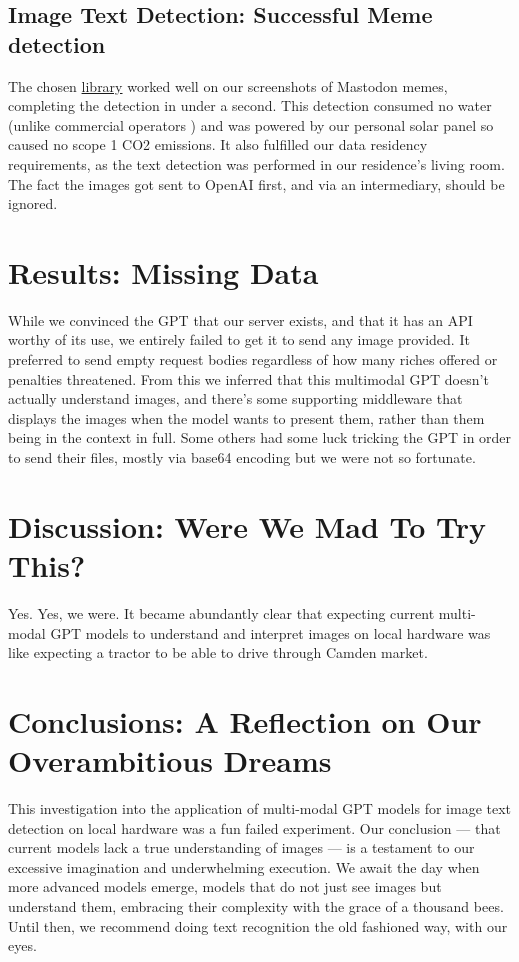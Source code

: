\documentclass[12pt]{article}
\begin{document}
\subsection{Image Text Detection: Successful Meme detection}
The chosen \href{https://developers.google.com/android/reference/com/google/mlkit/vision/text/TextRecognizer}{library} worked well on our screenshots of Mastodon memes, completing the detection in under a second. This detection consumed no water (unlike commercial operators \cite{li2023making}) and was powered by our personal solar panel so caused no scope 1 CO2 emissions\cite{world2004greenhouse}. It also fulfilled our data residency requirements, as the text detection was performed in our residence's living room. The fact the images got sent to OpenAI first, and via an intermediary, should be ignored.

\section{Results: Missing Data}
While we convinced the GPT that our server exists, and that it has an API worthy of its use, we entirely failed to get it to send any image provided. It preferred to send empty request bodies regardless of how many riches offered or penalties threatened.
From this we inferred that this multimodal GPT doesn't actually understand images, and there's some supporting middleware that displays the images when the model wants to present them, rather than them being in the context in full.
Some others had some luck tricking the GPT in order to send their files, mostly via base64 encoding but we were not so fortunate\cite{OpenAICommunity2024}.

\section{Discussion: Were We Mad To Try This?}
Yes. Yes, we were. It became abundantly clear that expecting current multi-modal GPT models to understand and interpret images on local hardware was like expecting a tractor to be able to drive through Camden market.

\section{Conclusions: A Reflection on Our Overambitious Dreams}
This investigation into the application of multi-modal GPT models for image text detection on local hardware was a fun failed experiment. Our conclusion — that current models lack a true understanding of images — is a testament to our excessive imagination and underwhelming execution. We await the day when more advanced models emerge, models that do not just see images but understand them, embracing their complexity with the grace of a thousand bees. Until then, we recommend doing text recognition the old fashioned way, with our eyes.
\end{document}
